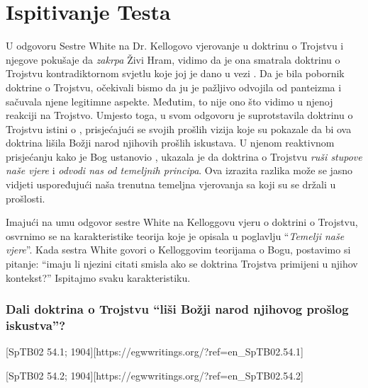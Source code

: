 \chapter{Ispitivanje Testa}

U odgovoru Sestre White na Dr. Kellogovo vjerovanje u doktrinu o Trojstvu i njegove pokušaje da \textit{zakrpa} Živi Hram, vidimo da je ona smatrala doktrinu o Trojstvu kontradiktornom svjetlu koje joj je dano u vezi . Da je bila pobornik doktrine o Trojstvu, očekivali bismo da ju je pažljivo odvojila od panteizma i sačuvala njene legitimne aspekte. Međutim, to nije ono što vidimo u njenoj reakciji na Trojstvo. Umjesto toga, u svom odgovoru je suprotstavila doktrinu o Trojstvu istini o , prisjećajući se svojih prošlih vizija koje su pokazale da bi ova doktrina lišila Božji narod njihovih prošlih iskustava. U njenom reaktivnom prisjećanju kako je Bog ustanovio , ukazala je da doktrina o Trojstvu \textit{ruši stupove naše vjere} i \textit{odvodi nas od temeljnih principa}. Ova izrazita razlika može se jasno vidjeti uspoređujući naša trenutna temeljna vjerovanja sa  koji su se držali u prošlosti.

Imajući na umu odgovor sestre White na Kelloggovu vjeru o doktrini o Trojstvu, osvrnimo se na karakteristike teorija koje je opisala u poglavlju “\textit{Temelji naše vjere}”. Kada sestra White govori o Kelloggovim teorijama o Bogu, postavimo si pitanje: “imaju li njezini citati smisla ako se doktrina Trojstva primijeni u njihov kontekst?” Ispitajmo svaku karakteristiku.

\subsection*{Dali doktrina o Trojstvu “liši Božji narod njihovog prošlog iskustva”?}

[SpTB02 54.1; 1904][https://egwwritings.org/?ref=en\_SpTB02.54.1]

[SpTB02 54.2; 1904][https://egwwritings.org/?ref=en\_SpTB02.54.2]

